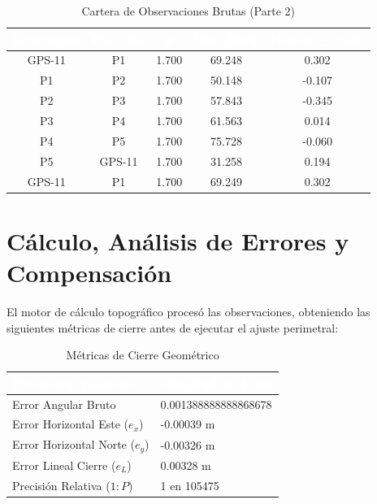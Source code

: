 \documentclass[11pt,letterpaper]{article}
\begin{document}
\begin{table}[H]
  \centering
  \small
  \caption{Cartera de Observaciones Brutas (Parte 2)}
  \label{tab:campo_1}
  \begin{tabular}{|c|c|c|c|c|}
    \hline
    \rowcolor{GeoBlue}
    \textcolor{white}{\textbf{Estacionado}} & \textcolor{white}{\textbf{Pto\_Obs}} & \textcolor{white}{\textbf{hr}} & \textcolor{white}{\textbf{Dist\_Horiz}} & \textcolor{white}{\textbf{Desnivel\_Crudo}} \\
    \hline
    \rowcolor{GeoBlue!5}
    GPS-11 & P1 & 1.700 & 69.248 & 0.302 \\
    \hline
    \rowcolor{white}
    P1 & P2 & 1.700 & 50.148 & -0.107 \\
    \hline
    \rowcolor{GeoBlue!5}
    P2 & P3 & 1.700 & 57.843 & -0.345 \\
    \hline
    \rowcolor{white}
    P3 & P4 & 1.700 & 61.563 & 0.014 \\
    \hline
    \rowcolor{GeoBlue!5}
    P4 & P5 & 1.700 & 75.728 & -0.060 \\
    \hline
    \rowcolor{white}
    P5 & GPS-11 & 1.700 & 31.258 & 0.194 \\
    \hline
    \rowcolor{GeoBlue!5}
    GPS-11 & P1 & 1.700 & 69.249 & 0.302 \\
    \hline
  \end{tabular}
\end{table}
\vspace{0.8cm}

\section{Cálculo, Análisis de Errores y Compensación}
El motor de cálculo topográfico procesó las observaciones, obteniendo las siguientes métricas de cierre antes de ejecutar el ajuste perimetral:
\begin{table}[H]
  \centering
  \caption{Métricas de Cierre Geométrico}
  \begin{tabular}{|l|l|}
    \hline
    \rowcolor{GeoBlue}
    \textcolor{white}{\textbf{Parámetro Analizado}} & \textcolor{white}{\textbf{Magnitud del Error}} \\
    \hline
    Error Angular Bruto & 0.001388888888868678 \\
    \rowcolor{GeoBlue!5}
    Error Horizontal Este ($e_x$) & -0.00039 m \\
    Error Horizontal Norte ($e_y$) & -0.00326 m \\
    \rowcolor{GeoBlue!5}
    Error Lineal Cierre ($e_L$) & 0.00328 m \\
    Precisión Relativa ($1:P$) & 1 en 105475 \\
    \hline
  \end{tabular}
\end{table}
\end{document}
